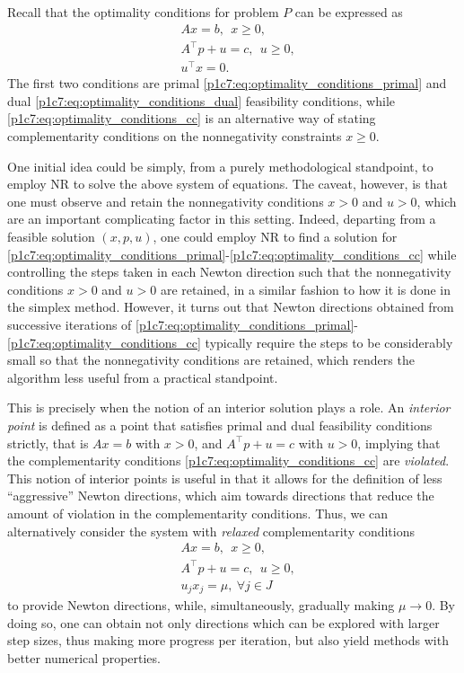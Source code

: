 Recall that the optimality conditions for problem $P$ can be expressed as
	\begin{align} 
		& Ax = b, \ \ x \ge 0, \label{p1c7:eq:optimality_conditions_primal} \\
		& A^\top p + u = c, \ \ u \ge 0, \label{p1c7:eq:optimality_conditions_dual} \\
		& u^\top x = 0. \label{p1c7:eq:optimality_conditions_cc}  
	\end{align}
	The first two conditions are primal \eqref{p1c7:eq:optimality_conditions_primal} and dual \eqref{p1c7:eq:optimality_conditions_dual} feasibility conditions, while \eqref{p1c7:eq:optimality_conditions_cc} is an alternative way of stating complementarity conditions on the nonnegativity constraints $x \ge 0$.
	
One initial idea could be simply, from a purely methodological standpoint, to employ NR to solve the above system of equations. The caveat, however, is that one must observe and retain the nonnegativity conditions $x > 0$ and $u >0$, which are an important complicating factor in this setting. Indeed, departing from a feasible solution $(x,p,u)$, one could employ NR to find a solution for \eqref{p1c7:eq:optimality_conditions_primal}-\eqref{p1c7:eq:optimality_conditions_cc} while controlling the steps taken in each Newton direction such that the nonnegativity conditions $x > 0$ and $u >0$ are retained, in a similar fashion to how it is done in the simplex method. However, it turns out that Newton directions obtained from successive iterations of \eqref{p1c7:eq:optimality_conditions_primal}- \eqref{p1c7:eq:optimality_conditions_cc} typically require the steps to be considerably small so that the nonnegativity conditions are retained, which renders the algorithm less useful from a practical standpoint.
	   
	
This is precisely when the notion of an interior solution plays a role. An \emph{interior point} is defined as a point that satisfies primal and dual feasibility conditions strictly, that is $Ax = b$ with $x > 0$, and $A^\top p + u = c$ with $u >0$, implying that the complementarity conditions \eqref{p1c7:eq:optimality_conditions_cc} are \emph{violated}. This notion of interior points is useful in that it allows for the definition of less ``aggressive'' Newton directions, which aim towards directions that reduce the amount of violation in the complementarity conditions. Thus, we can alternatively consider the system with \emph{relaxed} complementarity conditions 	
	\begin{align*}
		& Ax = b, \ \ x \geq 0,\\ 
		& A^\top p + u = c, \ \ u \geq 0, \\
		& u_j x_j = \mu, \ \forall j \in J 
	\end{align*}
	to provide Newton directions, while, simultaneously, gradually making $\mu \to 0$. By doing so, one can obtain not only directions which can be explored with larger step sizes, thus making more progress per iteration, but also yield methods with better numerical properties.
	
